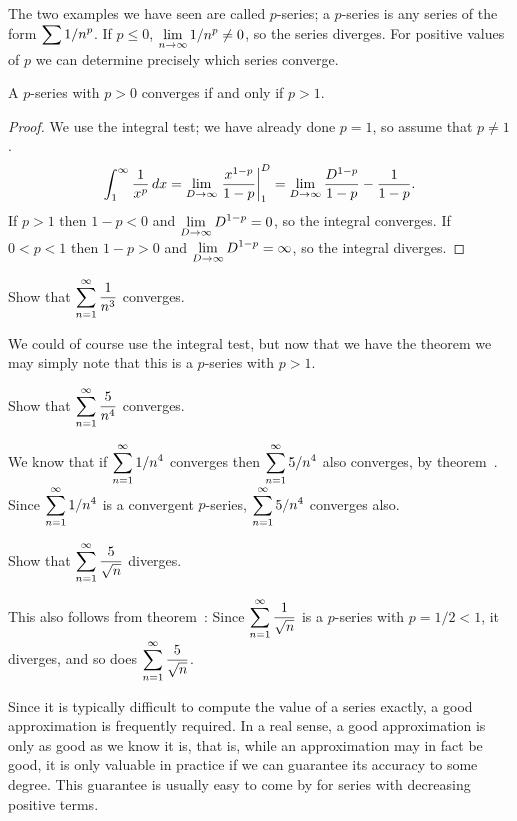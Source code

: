 The two examples we have seen are called
$p$-series; a $p$-series is
any series of the form $\displaystyle \sum 1/n^p$. If $p\le0$, $\displaystyle\lim_{n\to\infty}
1/n^p\not=0$, so the series diverges. For positive values of $p$ we
can determine precisely which series converge.

\begin{theorem} A $p$-series with $p>0$ converges if and only if $p>1$.
\end{theorem}
\begin{proof}
We use the integral test; we have already done $p=1$, so assume that
$p\not=1$.
$$
  \int_1^{\infty} {1\over x^p}\,dx=\lim_{D\to\infty} \left.{x^{1-p}\over
  1-p}\right|_{1}^D=\lim_{D\to\infty} {D^{1-p}\over 1-p}-{1\over 1-p}.
$$
If $p>1$ then $1-p<0$ and $\displaystyle\lim_{D\to\infty}D^{1-p}=0$, so the
  integral converges. If $0<p<1$ then $1-p>0$ and 
$\displaystyle\lim_{D\to\infty}D^{1-p}=\infty$, so the integral diverges.
\end{proof}

\begin{example} Show that $\displaystyle\sum_{n=1}^\infty {1\over {n^3}}$ converges. 
\par\nobreak\ssk\noindent
We could of course use
the integral test, but now that we have the theorem we may simply note
that this is a $p$-series with $p>1$.
\end{example}

\begin{example} Show that $\displaystyle\sum_{n=1}^\infty {5\over n^4}$ converges. 
\par\nobreak\ssk\noindent
We know that if
$\displaystyle \sum_{n=1}^\infty 1/n^4$ converges then $\displaystyle \sum_{n=1}^\infty 5/n^4$
also converges, by theorem~. Since 
$\displaystyle \sum_{n=1}^\infty 1/n^4$ is a convergent $p$-series, 
 $\displaystyle \sum_{n=1}^\infty 5/n^4$ converges also.
\end{example}

\begin{example} Show that $\displaystyle\sum_{n=1}^\infty {5\over \sqrt{n}}$ diverges.
\par\nobreak\ssk\noindent This also follows from
theorem~: Since $\displaystyle\sum_{n=1}^\infty
{1\over \sqrt{n}}$ is a $p$-series with $p=1/2<1$, it diverges, and so
does $\displaystyle\sum_{n=1}^\infty {5\over \sqrt{n}}$.  
\end{example}

Since it is typically difficult to compute the value of a series
exactly, a good approximation is frequently required. In a real sense,
a good approximation is only as good as we know it is, that is, while
an approximation may in fact be good, it is only valuable in practice
if we can guarantee its accuracy to some degree. This guarantee is
usually easy to come by for series with decreasing positive terms.


